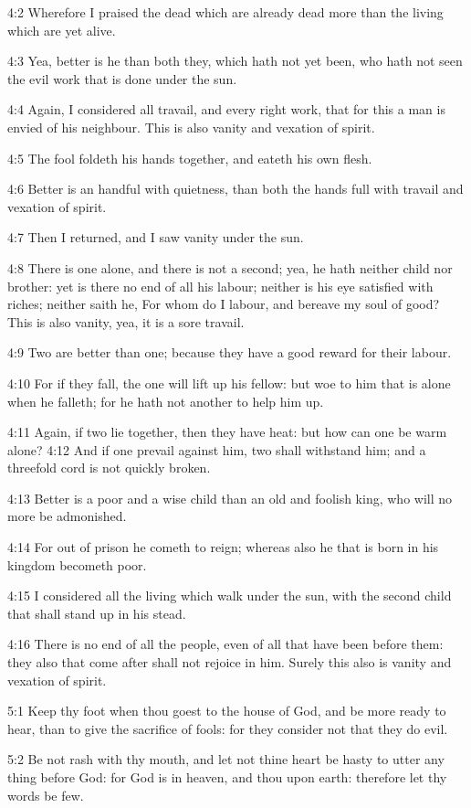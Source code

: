 4:2 Wherefore I praised the dead which are already dead more than the
living which are yet alive.

4:3 Yea, better is he than both they, which hath not yet been, who
hath not seen the evil work that is done under the sun.

4:4 Again, I considered all travail, and every right work, that for
this a man is envied of his neighbour. This is also vanity and
vexation of spirit.

4:5 The fool foldeth his hands together, and eateth his own flesh.

4:6 Better is an handful with quietness, than both the hands full with
travail and vexation of spirit.

4:7 Then I returned, and I saw vanity under the sun.

4:8 There is one alone, and there is not a second; yea, he hath
neither child nor brother: yet is there no end of all his labour;
neither is his eye satisfied with riches; neither saith he, For whom
do I labour, and bereave my soul of good? This is also vanity, yea, it
is a sore travail.

4:9 Two are better than one; because they have a good reward for their
labour.

4:10 For if they fall, the one will lift up his fellow: but woe to him
that is alone when he falleth; for he hath not another to help him up.

4:11 Again, if two lie together, then they have heat: but how can one
be warm alone?  4:12 And if one prevail against him, two shall
withstand him; and a threefold cord is not quickly broken.

4:13 Better is a poor and a wise child than an old and foolish king,
who will no more be admonished.

4:14 For out of prison he cometh to reign; whereas also he that is
born in his kingdom becometh poor.

4:15 I considered all the living which walk under the sun, with the
second child that shall stand up in his stead.

4:16 There is no end of all the people, even of all that have been
before them: they also that come after shall not rejoice in him.
Surely this also is vanity and vexation of spirit.

5:1 Keep thy foot when thou goest to the house of God, and be more
ready to hear, than to give the sacrifice of fools: for they consider
not that they do evil.

5:2 Be not rash with thy mouth, and let not thine heart be hasty to
utter any thing before God: for God is in heaven, and thou upon earth:
therefore let thy words be few.

